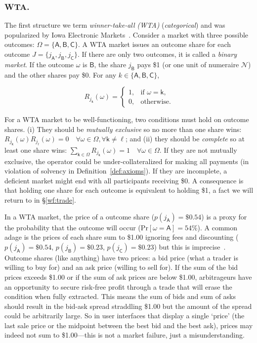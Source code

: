 \subsubsection{WTA.}

The first structure we term \textit{winner-take-all (WTA)} (\aka \textit{categorical}) and was popularized by Iowa Electronic Markets~\cite{iem}. Consider a market with three possible outcomes: $\Omega=\{\mathsf{A}, \mathsf{B}, \mathsf{C}\}$.  A WTA market issues an outcome share for each outcome $J=\{j_\mathsf{A}, j_\mathsf{B}, j_\mathsf{C}\}$. If there are only two outcomes, it is called a \textit{binary market}. If the outcome $\omega$ is $\mathsf{B}$, the share $j_\mathsf{B}$ pays \$1 (or one unit of numeraire $\mathcal{N}$) and the other shares pay \$0.  For any $k\in\{\mathsf{A},\mathsf{B},\mathsf{C}\}$,

\begin{equation}
R_{j_{\mathsf{k}}}(\omega)=\begin{cases}1, & \text{if } \omega=\mathsf{k},\\0, & \text{otherwise.}\end{cases}
\end{equation}

For a WTA market to be well-functioning, two conditions must hold on outcome shares. (i) They should be \textit{mutually exclusive} so no more than one share wins: $R_{j_{\mathsf{k}}}(\omega)R_{j_{\mathsf{\ell}}}(\omega)=0 \quad \forall\omega\in\Omega, \forall\mathsf{k}\neq\mathsf{\ell} $; and (ii) they should be \textit{complete} so at least one share wins: $\sum_{\mathsf{k}\in\Omega} R_{j_{\mathsf{k}}}(\omega)=1\quad \forall \omega\in\Omega$. If they are not mutually exclusive, the operator could be under-collateralized for making all payments (in violation of solvency in Definition~\ref{def:axioms}). If they are incomplete, a deficient market might end with all participants receiving \$0. A consequence is that holding one share for each outcome is equivalent to holding \$1, a fact we will return to in \S\ref{wf:trade}. 

In a WTA market, the price of a outcome share (\eg $p(j_\mathsf{A})=\$0.54$) is a proxy for the probability that the outcome will occur (\eg $\mathrm{Pr}[\omega=\mathsf{A}]=54\%$). A common adage is the prices of each share sum to \$1.00 ignoring fees and discounting (\eg $p(j_\mathsf{A})=\$0.54$, $p(j_\mathsf{B})=\$0.23$, $p(j_\mathsf{C})=\$0.23$) but this is imprecise~\cite{BCFKMN14}. Outcome shares (like anything) have two prices: a bid price (what a trader is willing to buy for) and an ask price (willing to sell for). If the sum of the bid prices exceeds \$1.00 or if the sum of ask prices are below \$1.00, arbitrageurs have an opportunity to secure risk-free profit through a trade that will erase the condition when fully extracted. This means the sum of bids and sum of asks should result in the bid-ask spread straddling \$1.00 but the amount of the spread could be arbitrarily large. So in user interfaces that display a single `price' (\eg the last sale price or the midpoint between the best bid and the best ask), prices may indeed not sum to \$1.00---this is not a market failure, just a misunderstanding.  

